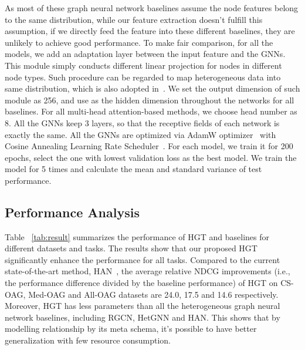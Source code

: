 \documentclass[sigconf]{acmart}
\theoremstyle{definition}
\begin{document}
{As most of these graph neural network baselines assume the node features belong to the same distribution, while our feature extraction doesn't fulfill this assumption, if we directly feed the feature into these different baselines, they are unlikely to achieve good performance. To make fair comparison, for all the models, we add an adaptation layer between the input feature and the GNNs. This module simply conducts different linear projection for nodes in different node types. Such procedure can be regarded to map heterogeneous data into same distribution, which is also adopted in~\cite{DBLP:conf/kdd/ZhangSHSC19, DBLP:conf/www/WangJSWYCY19}. We set the output dimension of such module as 256, and use as the hidden dimension throughout the networks for all baselines. For all multi-head attention-based methods, we choose head number as 8. All the GNNs keep 3 layers, so that the receptive fields of each network is exactly the same. All the GNNs are optimized via AdamW optimizer~\cite{DBLP:conf/iclr/LoshchilovH19} with Cosine Annealing Learning Rate Scheduler~\cite{DBLP:conf/iclr/LoshchilovH17}. For each model, we train it for 200 epochs, select the one with lowest validation loss as the best model. We train the model for 5 times and calculate the mean and standard variance of test performance. 


\subsection{Performance Analysis}

Table ~\ref{tab:result} summarizes the performance of HGT and baselines for different datasets and tasks. The results show that our proposed HGT significantly enhance the performance for all tasks. Compared to the current state-of-the-art method, HAN~\cite{DBLP:conf/www/WangJSWYCY19}, the average relative NDCG improvements (i.e., the performance difference  divided  by the baseline  performance) of HGT on CS-OAG, Med-OAG and All-OAG datasets are 24.0, 17.5 and 14.6 respectively. Moreover, HGT has less parameters than all the heterogeneous graph neural network baselines, including RGCN, HetGNN and HAN. This shows that by modelling relationship by its meta schema, it's possible to have better generalization with few resource consumption. 

}
\end{document}
